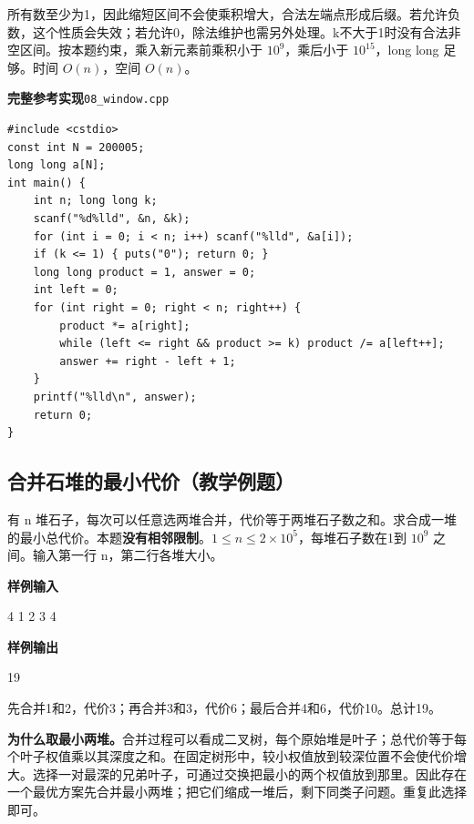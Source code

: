\documentclass[UTF8,11pt,a4paper,fontset=none]{ctexart}
\begin{document}
所有数至少为1，因此缩短区间不会使乘积增大，合法左端点形成后缀。若允许负数，这个性质会失效；若允许0，除法维护也需另外处理。k不大于1时没有合法非空区间。按本题约束，乘入新元素前乘积小于 $10^9$，乘后小于 $10^{15}$，long long 足够。时间 $O(n)$，空间 $O(n)$。
\par\noindent\begin{minipage}{\linewidth}
\textbf{完整参考实现}\quad\texttt{08\_window.cpp}
\begin{lstlisting}
#include <cstdio>
const int N = 200005;
long long a[N];
int main() {
    int n; long long k;
    scanf("%d%lld", &n, &k);
    for (int i = 0; i < n; i++) scanf("%lld", &a[i]);
    if (k <= 1) { puts("0"); return 0; }
    long long product = 1, answer = 0;
    int left = 0;
    for (int right = 0; right < n; right++) {
        product *= a[right];
        while (left <= right && product >= k) product /= a[left++];
        answer += right - left + 1;
    }
    printf("%lld\n", answer);
    return 0;
}
\end{lstlisting}
\end{minipage}\par

\subsection{合并石堆的最小代价（教学例题）}

有 n 堆石子，每次可以任意选两堆合并，代价等于两堆石子数之和。求合成一堆的最小总代价。本题\textbf{没有相邻限制}。$1\le n\le2\times10^5$，每堆石子数在1到 $10^9$ 之间。输入第一行 n，第二行各堆大小。
\begin{tcolorbox}[samplebox,title={输入输出样例}]
\textbf{样例输入}
\begin{Sample}
4
1 2 3 4
\end{Sample}
\tcblower
\textbf{样例输出}
\begin{Sample}
19
\end{Sample}
\end{tcolorbox}
先合并1和2，代价3；再合并3和3，代价6；最后合并4和6，代价10。总计19。

\textbf{为什么取最小两堆。}合并过程可以看成二叉树，每个原始堆是叶子；总代价等于每个叶子权值乘以其深度之和。在固定树形中，较小权值放到较深位置不会使代价增大。选择一对最深的兄弟叶子，可通过交换把最小的两个权值放到那里。因此存在一个最优方案先合并最小两堆；把它们缩成一堆后，剩下同类子问题。重复此选择即可。
\end{document}
